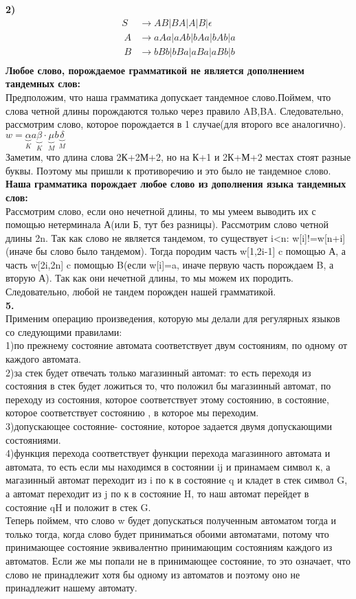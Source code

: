 \documentclass[a4paper,12pt]{article}
\begin{document}
\textbf{2)}\\
\begin{align*}
	S&\to AB|BA|A|B|\epsilon\\\
	A&\to aAa|aAb|bAa|bAb|a\\\
	B&\to bBb|bBa|aBa|aBb|b\\\
\end{align*}
\textbf{Любое слово, порождаемое грамматикой не является дополнением  тандемных слов:}\\
Предположим, что наша грамматика допускает тандемное слово.Поймем, что слова четной длины порождаются только через правило AB,BA. Следовательно, рассмотрим слово, которое порождается в 1 случае(для второго все аналогично). \\
$w=\underbrace{\alpha}_{K}a\underbrace{\beta}_{K}\cdot  \underbrace{\mu}_{M}b\underbrace{\delta}_{M}$\\
Заметим, что длина слова 2К+2М+2, но  на К+1 и 2К+М+2 местах стоят разные буквы. Поэтому мы пришли к противоречию и это было не тандемное слово.\\
\textbf{Наша грамматика порождает любое слово из дополнения языка тандемных слов:}\\
Рассмотрим слово, если оно нечетной длины, то мы умеем выводить их с помощью нетерминала А(или Б, тут без разницы). Рассмотрим слово четной длины 2n. Так как слово не является тандемом, то существует i<n: w[i]!=w[n+i](иначе бы слово было тандемом). Тогда породим часть w[1,2i-1] c помощью А, а часть w[2i,2n] c помощью B(если w[i]=a, иначе первую часть порождаем B, а вторую А). Так как они нечетной длины, то мы можем их породить. Следовательно, любой не тандем порожден нашей грамматикой.\\
\textbf{5.}\\
Применим операцию произведения, которую мы делали для регулярных языков со следующими правилами:\\
1)по прежнему состояние автомата соответствует двум состояниям, по одному от каждого автомата.\\
2)за стек будет отвечать только магазинный автомат: то есть переходя из состояния в стек будет ложиться то, что положил бы магазинный автомат, по переходу из состояния, которое соответствует этому состоянию, в состояние, которое соответствует состоянию , в которое мы переходим.\\
3)допускающее состояние- состояние, которое задается двумя допускающими состояниями.\\
4)функция перехода соответствует функции перехода магазинного автомата и автомата, то есть если мы находимся в состоянии ij и принамаем символ к, а магазинный автомат переходит из i по к в состояние q и кладет в стек символ G, а автомат переходит из j по к в состояние H, то наш автомат перейдет в состояние qH и положит в стек G. \\
 
Теперь поймем, что слово w будет допускаться полученным автоматом тогда и только тогда, когда слово будет приниматься обоими автоматами, потому что принимающее состояние эквивалентно принимающим состояниям каждого из автоматов. Если же мы попали не в принимающее состояние, то это означает, что слово не принадлежит хотя бы одному из автоматов и поэтому оно не принадлежит нашему автомату.\\
\end{document}
